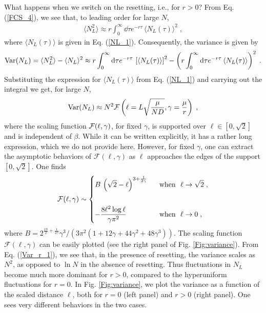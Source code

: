 \documentclass[onecolumn,superscriptaddress,
 amsmath,amssymb,
 aps,
 prd,
]{revtex4-1}
\newcommand{\bea}{\begin{eqnarray}}
\newcommand{\eea}{\end{eqnarray}}
\begin{document}
\vspace*{0.3cm}
What happens when we switch on the resetting, i.e., for $r>0$? From Eq. (\ref{FCS_4}), we see that, to leading order for large $N$,
\bea \label{NLsq}
\langle N_L^2 \rangle \approx r\int_0^\infty \dd \tau e^{-r\tau}\, \langle N_L(\tau)\rangle^2  \;,
\eea
where $\langle N_L(\tau)\rangle$ is given in Eq. (\ref{NL_1}). Consequently, the variance is given by
\bea \label{Var_r}
{\rm Var}(N_L) = \langle N_L^2\rangle - \langle N_L \rangle^2 \approx  r\int_0^\infty \dd \tau e^{-r\tau}\, \left[\langle N_L(\tau)\rangle\right]^2 -  \left(r\int_0^\infty \dd \tau e^{-r\tau}\, \langle N_L(\tau)\rangle \right)^2 \;.
\eea 
Substituting the expression for $\langle N_L(\tau)\rangle$ from Eq. (\ref{NL_1}) and carrying out the integral we get, for large $N$,
\bea \label{Var_r_1}
{\rm Var}(N_L) \approx N^2 {\cal F}\left( \ell = L \sqrt{\frac{\mu}{N D}}, \gamma = \frac{\mu}{r}\right) \;,
\eea
where the scaling function ${\cal F}(\ell, \gamma)$, for fixed $\gamma$, is supported over $\ell \in [0,\sqrt{2}]$ and is independent of $\beta$. While it can be written explicitly, it has a rather long expression, which we do not provide here. 
However, for fixed $\gamma$, one can extract the asymptotic behaviors of $\mathcal{F}(\ell, \gamma)$ as $\ell$ approaches the edges of the support $[0,\sqrt{2}]$. One finds
\begin{equation}
\mathcal{F}(\ell, \gamma) \sim \begin{dcases}
B\, \left(\sqrt{2}-\ell \right)^{3+\frac{1}{2\gamma}} 
 &\mbox{~~when~~} \ell \to \sqrt{2} \;, \\
 & \\
- \frac{8 \ell^2 \log \ell }{\gamma \pi^2} &\mbox{~~when~~} \ell \to 0 \;,
\end{dcases}
\end{equation}
where $B = {2^{\frac{19}{2} + \frac{1}{4\gamma}}} \gamma^3/(3 \pi ^2(1+12 \gamma + 44 \gamma^2 + 48 \gamma^3))$. The scaling function $\mathcal{F}(\ell, \gamma)$ can be easily plotted (see the right panel of Fig. \ref{Fig:variance}). From Eq. (\ref{Var_r_1}), we see that, in the presence of resetting, the variance scales as $N^2$, as opposed to $\ln N$ in the absence of resetting. Thus fluctuations in $N_L$ become much more dominant for $r>0$, compared to the hyperuniform fluctuations for $r=0$. In Fig. \ref{Fig:variance}, we plot the variance as a function of the scaled distance $\ell$, both for $r=0$ (left panel) and $r>0$ (right panel). One sees very different behaviors in the two cases.   
\end{document}
